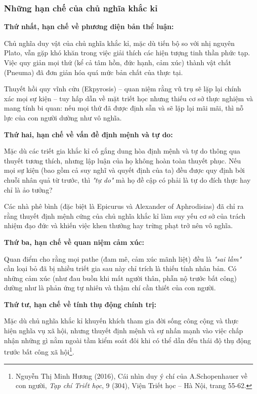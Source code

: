 \subsubsection{Những hạn chế của chủ nghĩa khắc kỉ}

\textbf{Thứ nhất, hạn chế về phương diện bản thể luận:}

Chủ nghĩa duy vật của chủ nghĩa khắc kỉ, mặc dù tiến bộ so với nhị nguyên Plato, vẫn gặp khó khăn trong việc giải thích các hiện tượng tinh thần phức tạp. Việc quy giản mọi thứ (kể cả tâm hồn, đức hạnh, cảm xúc) thành vật chất (Pneuma) đã đơn giản hóa quá mức bản chất của thực tại.

Thuyết hồi quy vĩnh cửu (Ekpyrosis) – quan niệm rằng vũ trụ sẽ lặp lại chính xác mọi sự kiện – tuy hấp dẫn về mặt triết học nhưng thiếu cơ sở thực nghiệm và mang tính bi quan: nếu mọi thứ đã được định sẵn và sẽ lặp lại mãi mãi, thì nỗ lực của con người dường như vô nghĩa.

\textbf{Thứ hai, hạn chế về vấn đề định mệnh và tự do:}

Mặc dù các triết gia khắc kỉ cố gắng dung hòa định mệnh và tự do thông qua thuyết tương thích, nhưng lập luận của họ không hoàn toàn thuyết phục. Nếu mọi sự kiện (bao gồm cả suy nghĩ và quyết định của ta) đều được quy định bởi chuỗi nhân quả từ trước, thì \textit{"tự do"} mà họ đề cập có phải là tự do đích thực hay chỉ là ảo tưởng?

Các nhà phê bình (đặc biệt là Epicurus và Alexander of Aphrodisias) đã chỉ ra rằng thuyết định mệnh cứng của chủ nghĩa khắc kỉ làm suy yếu cơ sở của trách nhiệm đạo đức và khiến việc khen thưởng hay trừng phạt trở nên vô nghĩa.

\textbf{Thứ ba, hạn chế về quan niệm cảm xúc:}

Quan điểm cho rằng mọi pathe (đam mê, cảm xúc mãnh liệt) đều là \textit{"sai lầm"} cần loại bỏ đã bị nhiều triết gia sau này chỉ trích là thiếu tính nhân bản. Có những cảm xúc (như đau buồn khi mất người thân, phẫn nộ trước bất công) dường như là phản ứng tự nhiên và thậm chí cần thiết của con người.

\textbf{Thứ tư, hạn chế về tính thụ động chính trị:}

Mặc dù chủ nghĩa khắc kỉ khuyến khích tham gia đời sống công cộng và thực hiện nghĩa vụ xã hội, nhưng thuyết định mệnh và sự nhấn mạnh vào việc chấp nhận những gì nằm ngoài tầm kiểm soát đôi khi có thể dẫn đến thái độ thụ động trước bất công xã hội\footnote{Nguyễn Thị Minh Hương (2016), Cái nhìn duy ý chí của A.Schopenhauer về con người, \textit{Tạp chí Triết học}, 9 (304), Viện Triết học – Hà Nội, trang 55-62.}.

